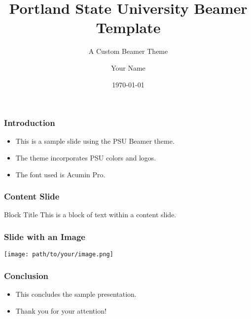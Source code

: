 \documentclass{beamer}
\title{Portland State University Beamer Template}
\subtitle{A Custom Beamer Theme}
\author{Your Name}
\institute{Portland State University}
\date{\today}
\begin{document}
\begin{frame}
    \titlepage
\end{frame}

\begin{frame}
    \frametitle{Introduction}
    \begin{itemize}
        \item This is a sample slide using the PSU Beamer theme.
        \item The theme incorporates PSU colors and logos.
        \item The font used is Acumin Pro.
    \end{itemize}
\end{frame}

\begin{frame}
    \frametitle{Content Slide}
    \begin{block}{Block Title}
        This is a block of text within a content slide.
    \end{block}
\end{frame}

\begin{frame}
    \frametitle{Slide with an Image}
    \begin{center}
        \texttt{[image: path/to/your/image.png]}
    \end{center}
\end{frame}

\begin{frame}
    \frametitle{Conclusion}
    \begin{itemize}
        \item This concludes the sample presentation.
        \item Thank you for your attention!
    \end{itemize}
\end{frame}
\end{document}
